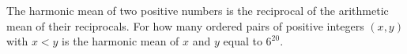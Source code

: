 The harmonic mean of two positive numbers is the reciprocal of the arithmetic mean of their reciprocals.  For how many ordered pairs of positive integers $(x,y)$ with $x<y$ is the harmonic mean of $x$ and $y$ equal to $6^{20}.$